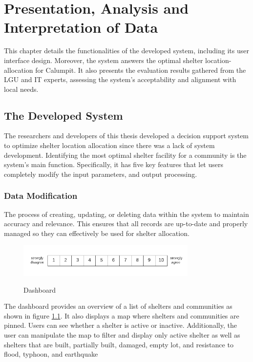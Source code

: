 \chapter{Presentation, Analysis and Interpretation of Data}
	This chapter details the functionalities of the developed system, including its user interface design. Moreover, the system answers the optimal shelter location-allocation for Calumpit. It also presents the evaluation results gathered from the LGU and IT experts, assessing the system’s acceptability and alignment with local needs.

\section{The Developed System}
	The researchers and developers of this thesis developed a decision support system to optimize shelter location allocation since there was a lack of system development. Identifying the most optimal shelter facility for a community is the system's main function. Specifically, it has five key features that let users completely modify the input parameters, and output processing. 


\subsection{Data Modification}
	The process of creating, updating, or deleting data within the system to maintain accuracy and relevance. This ensures that all records are up-to-date and properly managed so they can effectively be used for shelter allocation.
	
	\begin{figure}[h!]
		\caption{Dashboard}
		\centering
		\includegraphics[width=3.5in]{Nrs-10}
		\label{db}
	\end{figure}
	The dashboard provides an overview of a list of shelters and communities as shown in figure \ref{db}. It also displays a map where shelters and communities are pinned. Users can see whether a shelter is active or inactive. Additionally, the user can manipulate the map to filter and display only active shelter as well as shelters that are built, partially built, damaged, empty lot, and resistance to flood, typhoon, and earthquake
	
